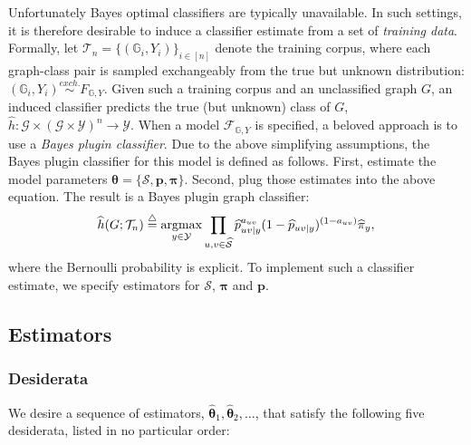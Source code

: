 \documentclass[10pt,journal,cspaper,compsoc]{IEEEtran}
\providecommand{\tk}[1]{\textcolor{black}{#1}}
\providecommand{\ve}[1]{\boldsymbol{#1}}
\newcommand{\argmax}{\operatornamewithlimits{argmax}}
\newcommand{\GG}{\mathbb{G}}
\newcommand{\bth}{\ve{\theta}}
\newcommand{\bhth}{\wh{\ve{\theta}}}
\newcommand{\bTh}{\ve{\Theta}}
\providecommand{\mc}[1]{\mathcal{#1}}
\providecommand{\mb}[1]{\boldsymbol{#1}}
\providecommand{\wh}[1]{\widehat{#1}}
\providecommand{\mhc}[1]{\widehat{\mathcal{#1}}}
\newcommand{\defeq}{\overset{\triangle}{=}}
\newcommand{\from}{{\ensuremath{\colon}}}           %
\newcommand{\comment}[1]{}
\begin{document}
Unfortunately Bayes optimal classifiers are typically unavailable. In such settings, it is therefore desirable to induce a classifier estimate from a set of \emph{training data}. Formally, let $\mc{T}_n= \{(\GG_i,Y_i)\}_{i \in [n]}$ denote the training corpus, where each graph-class pair is sampled exchangeably from the true but unknown distribution: $(\GG_i,Y_i) \overset{exch.}{\sim} F_{\GG, Y}$.  Given such a training corpus and an unclassified graph $G$, an induced classifier predicts the true (but unknown) class of $G$, $\wh{h}\from \mc{G} \times (\mc{G} \times \mc{Y})^n  \to \mc{Y}$.  When a model $\mc{F}_{\GG,Y}$ is specified, a beloved approach is to use a  \emph{Bayes plugin classifier}. Due to the above simplifying assumptions, the Bayes plugin classifier for this model is defined as follows.  First, estimate the  model parameters $\bth=\{\mc{S}, \mb{p}, \mb{\pi}\}$. Second, plug those estimates into the above equation.  The result is a Bayes plugin graph classifier:
\begin{align}
\wh{h}(G; \mc{T}_n) \defeq  \argmax_{y \in \mc{Y}} \prod_{u,v \in \mhc{S}}
\wh{p}_{uv|y}^{a_{uv}}(1-\wh{p}_{uv|y})^{(1-a_{uv})} \wh{\pi}_y,
\end{align}
where the Bernoulli probability is explicit. To implement such a classifier estimate, we specify estimators for $\mc{S}$, $\mb{\pi}$ and $\mb{p}$.


\subsection{Estimators} %
\label{sub:estimators}


\subsubsection{Desiderata} \label{sec:desiderata}

We desire a \comment{(}sequence of\comment{)} estimators\tk{, $\bhth_1,\bhth_2, \ldots$,} that satisfy the following five desiderata, listed in no particular order:
\end{document}
